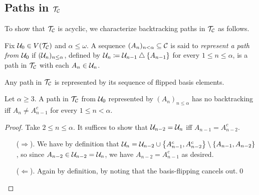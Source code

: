 \documentclass{amsart}
\begin{document}
    \subsection{Paths in $\mathcal{T}_{\mathcal{C}}$}

    To show that $\mathcal{T}_{\mathcal{C}}$ is acyclic, we characterize backtracking paths in $\mathcal{T}_{\mathcal{C}}$ as follows.

    \begin{definition}
        Fix $\mathcal{U}_0\in V(\mathcal{T}_{\mathcal{C}})$ and $\alpha\leq\omega$. A sequence $(A_n)_{n<\alpha}\subseteq\mathcal{C}$ is said to \textit{represent a path from $\mathcal{U}_0$} if $(\mathcal{U}_n)_{n\leq\alpha}$, defined by $\mathcal{U}_n\coloneqq\mathcal{U}_{n-1}\bigtriangleup\left\{A_{n-1}\right\}$ for every $1\leq n\leq\alpha$, is a path in $\mathcal{T}_{\mathcal{C}}$ with each $A_n\in\mathcal{U}_n$.
    \end{definition}

    \begin{remark}
        Any path in $\mathcal{T}_{\mathcal{C}}$ is represented by its sequence of flipped basis elements.
    \end{remark}

    \begin{lemma}\label{no-backtrack}
        Let $\alpha\geq3$. A path in $\mathcal{T}_{\mathcal{C}}$ from $\mathcal{U}_0$ represented by $(A_n)_{n\leq\alpha}$ has no backtracking iff $A_n\neq A_{n-1}^c$ for every $1\leq n<\alpha$.
    \end{lemma}
    \begin{proof}
        Take $2\leq n\leq\alpha$. It suffices to show that $\mathcal{U}_{n-2}=\mathcal{U}_n$ iff $A_{n-1}=A_{n-2}^c$.
        \begin{itemize}
            \item[($\Rightarrow$).] We have by definition that $\mathcal{U}_n=\mathcal{U}_{n-2}\cup\left\{A_{n-1}^c,A_{n-2}^c\right\}\setminus\left\{A_{n-1},A_{n-2}\right\}$, so since $A_{n-2}\in\mathcal{U}_{n-2}=\mathcal{U}_n$, we have $A_{n-2}=A_{n-1}^c$ as desired.
            \item[($\Leftarrow$).] Again by definition, by noting that the basis-flipping cancels out.\qed
        \end{itemize}
    \end{proof}
\end{document}
